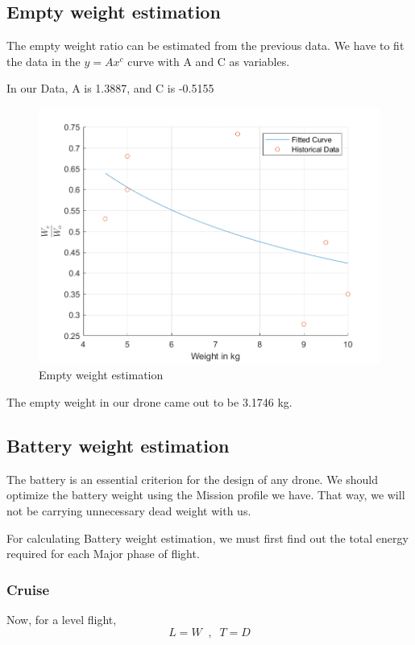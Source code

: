 \documentclass[12 pt]{article}
\begin{document}
\hfill


\subsection{Empty weight estimation}
The empty weight ratio can be estimated from the previous data. We have to fit the data in the $y = A x^c$ curve with A and C as variables.

In our Data, A is 1.3887, and C is -0.5155

\begin{figure}[h]
    \centering
    \includegraphics[width = 0.8\linewidth]{Codes/Week 2/Empty_weight.png}
    \caption{Empty weight estimation}
    \label{Empty Weight estimation}
\end{figure}

The empty weight in our drone came out to be 3.1746 kg.

\newpage

\subsection{Battery weight estimation}

The battery is an essential criterion for the design of any drone. We should optimize the battery weight using the Mission profile we have. That way, we will not be carrying unnecessary dead weight with us.

For calculating Battery weight estimation, we must first find out the total energy required for each Major phase of flight.

\subsubsection{Cruise}
Now, for a level flight,
$$ L = W \; \; , \; \; T = D$$
\end{document}
